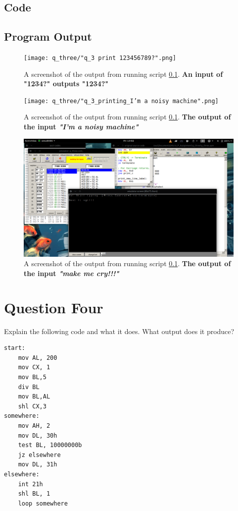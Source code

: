 \documentclass[]{article}
\begin{document}
\subsection{Code} \label{sketch 3}


\clearpage
\subsection{Program Output}


\begin{figure}[h]
	\texttt{[image: q\_three/"q\_3 print 123456789?".png]}
	\centering
	\caption{A screenshot of the output from running script \ref{sketch 3}. \textbf{An input of "1234?" outputs "1234?"}}
	\label{fig:5}
\end{figure}


\begin{figure}[h]
	\texttt{[image: q\_three/"q\_3\_printing\_I'm a noisy machine".png]}
	\centering
	\caption{A screenshot of the output from running script \ref{sketch 3}. \textbf{The output of the input \emph{"I'm a noisy machine"}}}
\end{figure}


\begin{figure}[h]
	\includegraphics[width=12cm]{q_three/Q3_printing_make_me_cry!!!.png}
	\centering
	\caption{A screenshot of the output from running script \ref{sketch 3}. \textbf{The output of the input \emph{"make me cry!!!"}}}
\end{figure}

\clearpage
\section{Question Four}
Explain the following code and what it does. What output does it produce?

\begin{lstlisting}[language={[x86masm]Assembler}]
start:
	mov AL, 200
	mov CX, 1
	mov BL,5
	div BL
	mov BL,AL
	shl CX,3
somewhere:
	mov AH, 2
	mov DL, 30h
	test BL, 10000000b
	jz elsewhere
	mov DL, 31h
elsewhere:
	int 21h
	shl BL, 1
	loop somewhere
\end{lstlisting}
\end{document}
